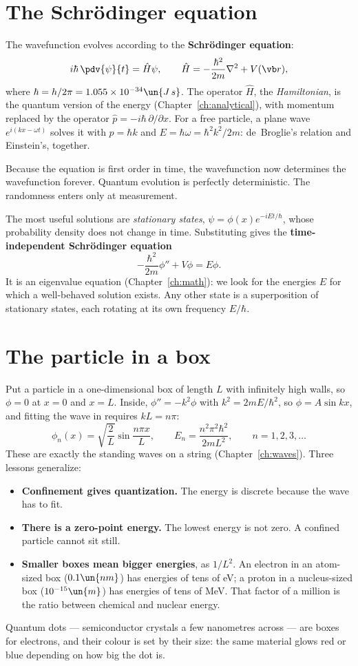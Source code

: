 \section{The Schr\"odinger equation}

The wavefunction evolves according to the \textbf{Schr\"odinger equation}:
\[
  i\hbar\,\pdv{\psi}{t} = \hat H\psi, \qquad \hat H = -\frac{\hbar^2}{2m}\nabla^2 + V(\vb r),
\]
where $\hbar = h/2\pi = 1.055\times10^{-34}\un{J\,s}$. The operator $\hat H$, the \emph{Hamiltonian}, is the quantum version of the energy (Chapter~\ref{ch:analytical}), with momentum replaced by the operator $\hat p = -i\hbar\,\partial/\partial x$. For a free particle, a plane wave $e^{i(kx-\omega t)}$ solves it with $p = \hbar k$ and $E = \hbar\omega = \hbar^2k^2/2m$: de~Broglie's relation and Einstein's, together.

Because the equation is first order in time, the wavefunction now determines the wavefunction forever. Quantum evolution is perfectly deterministic. The randomness enters only at measurement.

The most useful solutions are \emph{stationary states}, $\psi = \phi(x)e^{-iEt/\hbar}$, whose probability density does not change in time. Substituting gives the \textbf{time-independent Schr\"odinger equation}
\[
  -\frac{\hbar^2}{2m}\phi'' + V\phi = E\phi .
\]
It is an eigenvalue equation (Chapter~\ref{ch:math}): we look for the energies $E$ for which a well-behaved solution exists. Any other state is a superposition of stationary states, each rotating at its own frequency $E/\hbar$.

\section{The particle in a box}

Put a particle in a one-dimensional box of length $L$ with infinitely high walls, so $\phi = 0$ at $x=0$ and $x=L$. Inside, $\phi'' = -k^2\phi$ with $k^2 = 2mE/\hbar^2$, so $\phi = A\sin kx$, and fitting the wave in requires $kL = n\pi$:
\[
  \phi_n(x) = \sqrt{\frac2L}\sin\frac{n\pi x}{L},\qquad E_n = \frac{n^2\pi^2\hbar^2}{2mL^2},\qquad n = 1,2,3,\dots
\]
These are exactly the standing waves on a string (Chapter~\ref{ch:waves}). Three lessons generalize:
\begin{itemize}[itemsep=3pt]
  \item \textbf{Confinement gives quantization.} The energy is discrete because the wave has to fit.
  \item \textbf{There is a zero-point energy.} The lowest energy is not zero. A confined particle cannot sit still.
  \item \textbf{Smaller boxes mean bigger energies}, as $1/L^2$. An electron in an atom-sized box ($0.1\un{nm}$) has energies of tens of eV; a proton in a nucleus-sized box ($10^{-15}\un{m}$) has energies of tens of MeV. That factor of a million is the ratio between chemical and nuclear energy.
\end{itemize}
Quantum dots --- semiconductor crystals a few nanometres across --- are boxes for electrons, and their colour is set by their size: the same material glows red or blue depending on how big the dot is.

